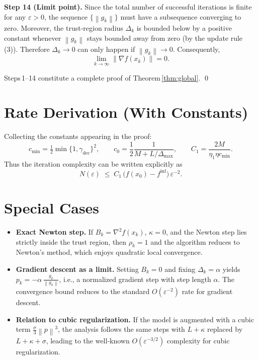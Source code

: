 \documentclass{article}
\newcommand{\norm}[1]{\left\lVert #1\right\rVert}
\begin{document}
\noindent\textbf{Step 14 (Limit point).}  
Since the total number of successful iterations is finite for any $\varepsilon>0$, the sequence $\{\norm{g_{k}}\}$ must have a subsequence converging to zero.  Moreover, the trust‑region radius $\Delta_{k}$ is bounded below by a positive constant whenever $\norm{g_{k}}$ stays bounded away from zero (by the update rule (3)).  Therefore $\Delta_{k}\to0$ can only happen if $\norm{g_{k}}\to0$.  Consequently,
\[
\lim_{k\to\infty}\norm{\nabla f(x_{k})}=0.
\tag{Step 14}
\]

Steps 1–14 constitute a complete proof of Theorem \ref{thm:global}.  \qed

\section*{Rate Derivation (With Constants)}
Collecting the constants appearing in the proof:
\[
c_{\min}= \tfrac12\min\{1,\gamma_{\text{dec}}\}^{2},\qquad
c_{0}= \frac12\frac{1}{M+L/\Delta_{\max}},\qquad
C_{1}= \frac{2M}{\eta_{1}\eta c_{\min}}.
\]
Thus the iteration complexity can be written explicitly as
\[
N(\varepsilon)\;\le\;
C_{1}\,\bigl(f(x_{0})-f^{\inf}\bigr)\,\varepsilon^{-2}.
\]

\section*{Special Cases}
\begin{itemize}
\item \textbf{Exact Newton step.}  If $B_{k}=\nabla^{2}f(x_{k})$, $\kappa=0$, and the Newton step lies strictly inside the trust region, then $\rho_{k}=1$ and the algorithm reduces to Newton’s method, which enjoys quadratic local convergence.
\item \textbf{Gradient descent as a limit.}  Setting $B_{k}=0$ and fixing $\Delta_{k}=\alpha$ yields $p_{k}= -\alpha\,\frac{g_{k}}{\norm{g_{k}}}$, i.e., a normalized gradient step with step length $\alpha$.  The convergence bound reduces to the standard $O(\varepsilon^{-2})$ rate for gradient descent.
\item \textbf{Relation to cubic regularization.}  If the model is augmented with a cubic term $\frac{\sigma}{3}\norm{p}^{3}$, the analysis follows the same steps with $L+\kappa$ replaced by $L+\kappa+\sigma$, leading to the well‑known $O(\varepsilon^{-3/2})$ complexity for cubic regularization.
\end{itemize}
\end{document}
